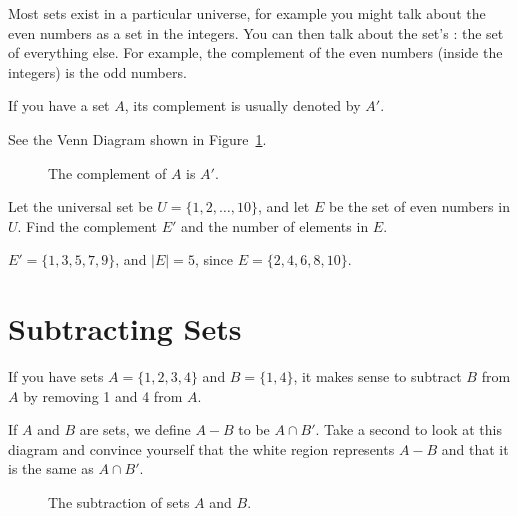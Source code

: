 Most sets exist in a particular universe, for example you might talk
about the even numbers as a set in the integers. You can then talk
about the set's : the set of everything else. For
example, the complement of the even numbers (inside the integers) is
the odd numbers.

If you have a set $A$, its complement is usually denoted by $A'$.

See the Venn Diagram shown in Figure~\ref{fig:complement_set}.
\begin{figure}[H]
    \centering
    \caption{The complement of $A$ is $A'$.}
    \label{fig:complement_set}
\end{figure}

\begin{Exercise}[title={Complement and Size}, label=sets_complement]
Let the universal set be $U = \{1, 2, \ldots, 10\}$, and let $E$ be the set of even numbers in $U$. Find the complement $E'$ and the number of elements in $E$.
\end{Exercise}
\begin{Answer}[ref=sets_complement]
$E' = \{1, 3, 5, 7, 9\}$, and $|E| = 5$, since $E = \{2, 4, 6, 8, 10\}$.
\end{Answer}

\section{Subtracting Sets}
If you have sets $A = \{1,2,3,4\}$ and $B = \{1, 4\}$, it makes sense
to subtract $B$ from $A$ by removing 1 and 4 from $A$.

If $A$ and $B$ are sets, we define $A - B$ to be $A \cap B'$.  Take a
second to look at this diagram and convince yourself that the white
region represents $A - B$ and that it is the same as $A \cap B'$.

\begin{figure}[H]
    \centering
    \caption{The subtraction of sets $A$ and $B$.}
    \label{fig:subtraction_sets}
\end{figure}

